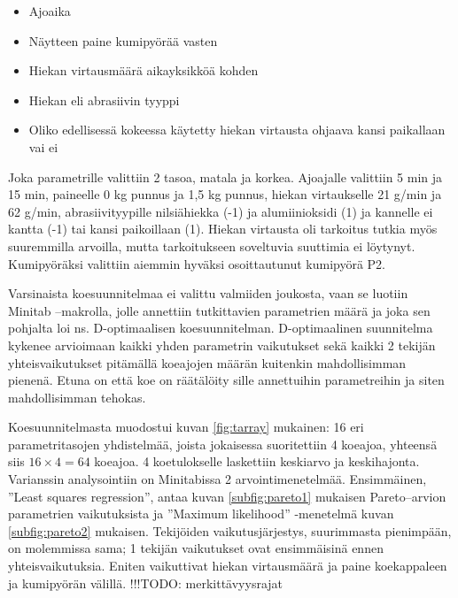 \documentclass[12pt,a4paper,finnish]{tutthesis}
\newcommand\todo[1]{{\color{red}!!!TODO: #1}} %
\begin{document}
\begin{itemize}
  \item Ajoaika
  \item Näytteen paine kumipyörää vasten
  \item Hiekan virtausmäärä aikayksikköä kohden
  \item Hiekan eli abrasiivin tyyppi
  \item Oliko edellisessä kokeessa käytetty hiekan virtausta ohjaava kansi paikallaan vai ei
\end{itemize}

Joka parametrille valittiin 2 tasoa, matala ja korkea. Ajoajalle valittiin 5 min ja 15 min, paineelle 0 kg punnus ja 1,5 kg punnus, hiekan virtaukselle 21 g/min ja 62 g/min, abrasiivityypille nilsiähiekka (-1) ja alumiinioksidi (1) ja kannelle ei kantta (-1) tai kansi paikoillaan (1). Hiekan virtausta oli tarkoitus tutkia myös suuremmilla arvoilla, mutta tarkoitukseen soveltuvia suuttimia ei löytynyt. Kumipyöräksi valittiin aiemmin hyväksi osoittautunut kumipyörä P2.

Varsinaista koesuunnitelmaa ei valittu valmiiden joukosta, vaan se luotiin Minitab –makrolla, jolle annettiin tutkittavien parametrien määrä ja joka sen pohjalta loi ns. D-optimaalisen koesuunnitelman. D-optimaalinen suunnitelma kykenee arvioimaan kaikki yhden parametrin vaikutukset sekä kaikki 2 tekijän yhteisvaikutukset pitämällä koeajojen määrän kuitenkin mahdollisimman pienenä. Etuna on että koe on räätälöity sille annettuihin parametreihin ja siten mahdollisimman tehokas.

Koesuunnitelmasta muodostui kuvan \ref{fig:tarray} mukainen:
16 eri parametritasojen yhdistelmää, joista jokaisessa suoritettiin 4 koeajoa, yhteensä siis \(16\times 4 = 64\) koeajoa. 4 koetulokselle laskettiin keskiarvo ja keskihajonta.
Varianssin analysointiin on Minitabissa 2 arvointimenetelmää. Ensimmäinen, ”Least squares regression”, antaa kuvan \ref{subfig:pareto1} mukaisen Pareto–arvion parametrien vaikutuksista
ja ”Maximum likelihood” -menetelmä kuvan \ref{subfig:pareto2} mukaisen.
Tekijöiden vaikutusjärjestys, suurimmasta pienimpään, on molemmissa sama;
1 tekijän vaikutukset ovat ensimmäisinä ennen yhteisvaikutuksia.
Eniten vaikuttivat hiekan virtausmäärä ja paine koekappaleen ja kumipyörän välillä.
\todo{merkittävyysrajat}
\end{document}
